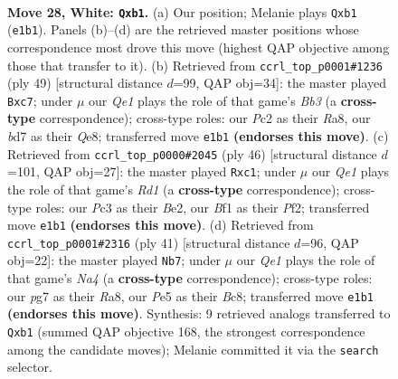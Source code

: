\documentclass[11pt]{article}
\begin{document}
\clearpage

\begin{figure}[p]\centering
\begin{subfigure}{0.46\textwidth}\centering
\resizebox{\linewidth}{!}{%
\newchessgame
\chessboard[
  setfen={1n3rk1/2qb1ppp/8/4Pp2/p4P2/2P5/P1P2KPP/1r2QBNR w - - 0 28},
  showmover=false,
  pgfstyle=straightmove, color=movearrow, markmove={e1-b1}
]}
\caption{}
\end{subfigure}\hfill
\begin{subfigure}{0.46\textwidth}\centering
\resizebox{\linewidth}{!}{%
\newchessgame
\chessboard[
  setfen={r3q1k1/ppB3p1/1b2p2p/4Np1n/8/5P2/PPP1Q3/1K1R3R b - - 0 25},
  showmover=false,
  pgfstyle=straightmove, color=movearrow, markmove={b6-c7}
]}
\caption{}
\end{subfigure}
\\[4pt]
\begin{subfigure}{0.46\textwidth}\centering
\resizebox{\linewidth}{!}{%
\newchessgame
\chessboard[
  setfen={r5k1/1b1nqppp/4p3/p7/Pp1NP3/4Q3/1P2BPPP/2rR2K1 w - - 0 24},
  showmover=false,
  pgfstyle=straightmove, color=movearrow, markmove={d1-c1}
]}
\caption{}
\end{subfigure}\hfill
\begin{subfigure}{0.46\textwidth}\centering
\resizebox{\linewidth}{!}{%
\newchessgame
\chessboard[
  setfen={r1b1qrk1/7p/p1pp2p1/n5P1/NQP5/8/PP4P1/2KR1B1R b - - 0 21},
  showmover=false,
  pgfstyle=straightmove, color=movearrow, markmove={a5-b7}
]}
\caption{}
\end{subfigure}
\caption{\textbf{Move 28, White: \texttt{Qxb1}.} (a) Our position; Melanie plays \texttt{Qxb1} (\texttt{e1b1}). Panels (b)--(d) are the retrieved master positions whose correspondence most drove this move (highest QAP objective among those that transfer to it). (b) Retrieved from \texttt{ccrl\_top\_p0001\#1236} (ply 49) [structural distance $d$=99, QAP obj=34]: the master played \texttt{Bxc7}; under $\mu$ our \emph{Qe1} plays the role of that game's \emph{Bb3} (a \textbf{cross-type} correspondence); cross-type roles: our \emph{P}c2 as their \emph{R}a8, our \emph{b}d7 as their \emph{Q}e8; transferred move \texttt{e1b1} \textbf{(endorses this move)}. (c) Retrieved from \texttt{ccrl\_top\_p0000\#2045} (ply 46) [structural distance $d$=101, QAP obj=27]: the master played \texttt{Rxc1}; under $\mu$ our \emph{Qe1} plays the role of that game's \emph{Rd1} (a \textbf{cross-type} correspondence); cross-type roles: our \emph{P}c3 as their \emph{B}e2, our \emph{B}f1 as their \emph{P}f2; transferred move \texttt{e1b1} \textbf{(endorses this move)}. (d) Retrieved from \texttt{ccrl\_top\_p0001\#2316} (ply 41) [structural distance $d$=96, QAP obj=22]: the master played \texttt{Nb7}; under $\mu$ our \emph{Qe1} plays the role of that game's \emph{Na4} (a \textbf{cross-type} correspondence); cross-type roles: our \emph{p}g7 as their \emph{R}a8, our \emph{P}e5 as their \emph{B}c8; transferred move \texttt{e1b1} \textbf{(endorses this move)}. Synthesis: 9 retrieved analogs transferred to \texttt{Qxb1} (summed QAP objective 168, the strongest correspondence among the candidate moves); Melanie committed it via the \texttt{search} selector.}
\label{fig:thought-m54}
\end{figure}
\end{document}

